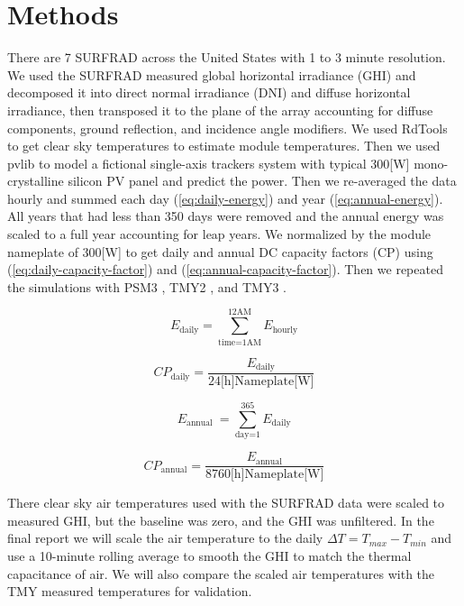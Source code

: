 \documentclass[conference]{IEEEtran}
\begin{document}
\section{Methods}
There are 7 SURFRAD \cite{Augustine2000} across the United States with 1 to 3 minute resolution. We used the SURFRAD measured global horizontal irradiance (GHI) and decomposed it into direct normal irradiance (DNI) and diffuse horizontal irradiance, then transposed it to the plane of the array accounting for diffuse components, ground reflection, and incidence angle modifiers. We used RdTools \cite{Jordan2018} to get clear sky temperatures to estimate module temperatures. Then we used pvlib \cite{F.Holmgren2018} to model a fictional single-axis trackers system with typical 300[W] mono-crystalline silicon PV panel and predict the power. Then we re-averaged the data hourly and summed each day (\ref{eq:daily-energy}) and year (\ref{eq:annual-energy}). All years that had less than 350 days were removed and the annual energy was scaled to a full year accounting for leap years. We normalized by the module nameplate of 300[W] to get daily and annual DC capacity factors (CP) using (\ref{eq:daily-capacity-factor}) and (\ref{eq:annual-capacity-factor}). Then we repeated the simulations with PSM3 \cite{Habte2017}, TMY2 \cite{Marion1995}, and TMY3 \cite{Wilcox2008}.

\begin{equation}
E_\text{daily} = \sum_\text{time=1AM}^\text{12AM}{E_\text{hourly}} \label{eq:daily-energy}
\end{equation}

\begin{equation}
\mathit{CP}_\text{daily} = \frac{E_\text{daily}}{ 24\text{[h]} \text{Nameplate[W]} } \label{eq:daily-capacity-factor}
\end{equation}

\begin{equation}
E_\text{annual }= \sum_\text{day=1}^\text{365}{E_\text{daily}} \label{eq:annual-energy}
\end{equation}

\begin{equation}
\mathit{CP}_\text{annual} = \frac{E_\text{annual}}{ 8760\text{[h]} \text{Nameplate[W]} } \label{eq:annual-capacity-factor}
\end{equation}

There clear sky air temperatures used with the SURFRAD data were scaled to measured GHI, but the baseline was zero, and the GHI was unfiltered. In the final report we will scale the air temperature to the daily $\Delta T = T_{max} - T_{min}$ and use a 10-minute rolling average to smooth the GHI to match the thermal capacitance of air. We will also compare the scaled air temperatures with the TMY measured temperatures for validation.
\end{document}
